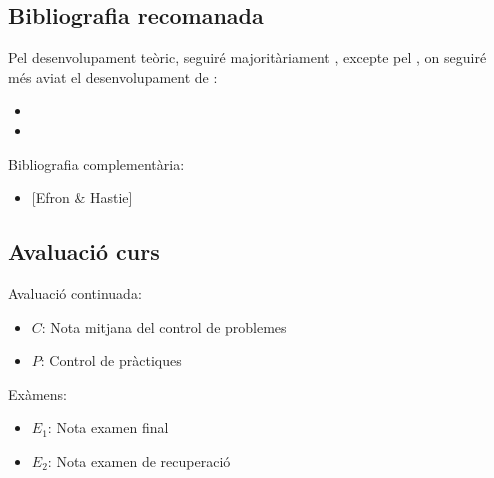 \documentclass[letterpaper,10pt,english]{sphinxmanual}
\begin{document}
\subsection{Bibliografia recomanada}
\label{\detokenize{0_Intro/0_0_Intro_curs:bibliografia-recomanada}}
Pel desenvolupament teòric, seguiré majoritàriament ,
excepte pel , on seguiré més aviat el desenvolupament
de \sphinxstyleemphasis{{[}Rice{]}}:
\begin{itemize}
\item {} 
 

\item {} 
\sphinxstyleemphasis{{[}Rice{]}} 

\end{itemize}

Bibliografia complementària:
\begin{itemize}
\item {} 
{[}Efron \& Hastie{]} 

\end{itemize}


\subsection{Avaluació curs}
\label{\detokenize{0_Intro/0_0_Intro_curs:avaluacio-curs}}
Avaluació continuada:
\begin{itemize}
\item {} 
\(C\): Nota mitjana del control de problemes

\item {} 
\(P\): Control de pràctiques

\end{itemize}

Exàmens:
\begin{itemize}
\item {} 
\(E_1\): Nota examen final

\item {} 
\(E_2\): Nota examen de recuperació

\end{itemize}
\end{document}
